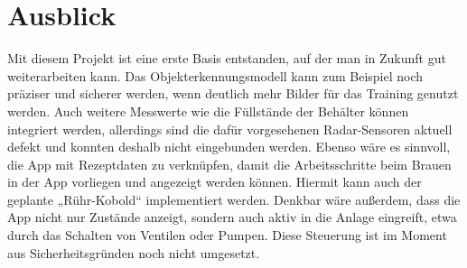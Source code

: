 \section{Ausblick}
Mit diesem Projekt ist eine erste Basis entstanden, auf der man in Zukunft gut weiterarbeiten kann. Das Objekterkennungsmodell kann zum Beispiel noch präziser und sicherer werden, wenn deutlich mehr Bilder für das Training genutzt werden. Auch weitere Messwerte wie die Füllstände der Behälter können integriert werden, allerdings sind die dafür vorgesehenen Radar-Sensoren aktuell defekt und konnten deshalb nicht eingebunden werden.
Ebenso wäre es sinnvoll, die App mit Rezeptdaten zu verknüpfen, damit die Arbeitsschritte beim Brauen in der App vorliegen und angezeigt werden können. Hiermit kann auch der geplante „Rühr-Kobold“ implementiert werden.
Denkbar wäre außerdem, dass die App nicht nur Zustände anzeigt, sondern auch aktiv in die Anlage eingreift, etwa durch das Schalten von Ventilen oder Pumpen. Diese Steuerung ist im Moment aus Sicherheitsgründen noch nicht umgesetzt.